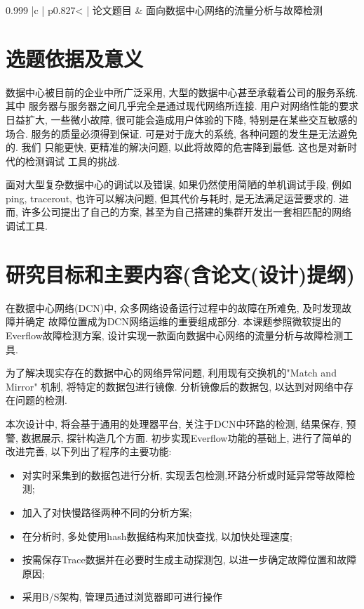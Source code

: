 
\vspace{-4pt}
{

\noindent
\begin{tabular*}{0.999\textwidth}
    {|c | p{}< {\centering} |}
    \hline
    {\songti 论文题目} & {\songti 面向数据中心网络的流量分析与故障检测} \\ 
    \hline
\end{tabular*}
\indent

\begin{mdframed}[everyline=true]

\section{选题依据及意义}

数据中心被目前的企业中所广泛采用, 大型的数据中心甚至承载着公司的服务系统. 其中
服务器与服务器之间几乎完全是通过现代网络所连接. 用户对网络性能的要求日益扩大,
一些微小故障, 很可能会造成用户体验的下降, 特别是在某些交互敏感的场合.
服务的质量必须得到保证. 可是对于庞大的系统, 各种问题的发生是无法避免的. 我们
只能更快, 更精准的解决问题, 以此将故障的危害降到最低. 这也是对新时代的检测调试
工具的挑战.


面对大型复杂数据中心的调试以及错误, 如果仍然使用简陋的单机调试手段,
例如ping, tracerout, 也许可以解决问题, 但其代价与耗时, 是无法满足运营要求的.
进而, 许多公司提出了自己的方案, 甚至为自己搭建的集群开发出一套相匹配的网络调试工具.


\section{研究目标和主要内容(含论文(设计)提纲)}

在数据中心网络(DCN)中, 众多网络设备运行过程中的故障在所难免, 及时发现故障并确定 
故障位置成为DCN网络运维的重要组成部分. 本课题参照微软提出的Everflow故障检测方案,
设计实现一款面向数据中心网络的流量分析与故障检测工具.

为了解决现实存在的数据中心的网络异常问题, 利用现有交换机的"Match and Mirror"
机制, 将特定的数据包进行镜像. 分析镜像后的数据包, 以达到对网络中存在问题的检测.

本次设计中, 将会基于通用的处理器平台, 关注于DCN中环路的检测, 结果保存, 预警,
数据展示, 探针构造几个方面. 初步实现Everflow功能的基础上, 进行了简单的改进完善,
以下列出了程序的主要功能:

\begin{itemize}
    \setlength\itemsep{0.1em}
    \item 对实时采集到的数据包进行分析, 实现丢包检测,环路分析或时延异常等故障检测;
    \item 加入了对快慢路径两种不同的分析方案;
    \item 在分析时, 多处使用hash数据结构来加快查找, 以加快处理速度;
    \item 按需保存Trace数据并在必要时生成主动探测包, 以进一步确定故障位置和故障原因;
    \item 采用B/S架构, 管理员通过浏览器即可进行操作
\end{itemize}


\end{mdframed}}
